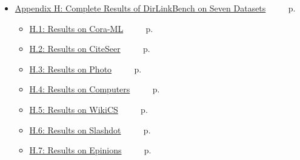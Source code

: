 \begin{itemize}
  \vspace{4pt}
  \item \hyperlink{app_complete_res}{Appendix H: Complete Results of DirLinkBench on Seven Datasets} ~~~~ p.\pageref{app_complete_res}
  \vspace{4pt}
   \begin{itemize}[leftmargin=2em, nosep] %
    \item \hyperlink{app_complete_res_cora}{H.1: Results on Cora-ML} ~~~~ p.\pageref{app_complete_res_cora} \\
    \item \hyperlink{app_complete_res_citeseer}{H.2: Results on CiteSeer} ~~~~ p.\pageref{app_complete_res_citeseer} \\
    \item \hyperlink{app_complete_res_photo}{H.3: Results on Photo} ~~~~ p.\pageref{app_complete_res_photo} \\
    \item \hyperlink{app_complete_res_computers}{H.4: Results on Computers} ~~~~ p.\pageref{app_complete_res_computers} \\
    \item \hyperlink{app_complete_res_wiki}{H.5: Results on WikiCS} ~~~~ p.\pageref{app_complete_res_wiki} \\
    \item \hyperlink{app_complete_res_slash}{H.6: Results on Slashdot} ~~~~ p.\pageref{app_complete_res_slash} \\
    \item \hyperlink{app_complete_res_epinion}{H.7: Results on Epinions} ~~~~ p.\pageref{app_complete_res_epinion} 
  \end{itemize}
  
   
\end{itemize}

\newpage

\hypertarget{app:app_notation}{} 
